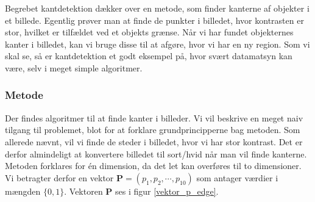 {
Begrebet kantdetektion dækker over en metode, som finder kanterne af
objekter i et billede. Egentlig prøver man at finde de punkter i
billedet, hvor kontrasten er stor, hvilket er tilfældet ved et objekts
grænse. Når vi har fundet objekternes kanter i billedet, kan vi bruge
disse til at afgøre, hvor vi har en ny region.  Som vi skal se, så er
kantdetektion et godt eksempel på, hvor svært datamatsyn kan være, selv
i meget simple algoritmer.

\subsubsection*{Metode}
Der findes algoritmer til at finde kanter i
billeder\cite{SIOlsen}. Vi vil beskrive en meget naiv tilgang til
problemet, blot for at forklare grundprincipperne bag metoden. Som
allerede nævnt, vil vi finde de steder i billedet, hvor vi har stor
kontrast. Det er derfor almindeligt at konvertere billedet til sort/hvid
når man vil finde kanterne. Metoden forklares for én dimension, da det
let kan overføres til to dimensioner. Vi betragter derfor en vektor
$\mathbf{P} = (p_1, p_2, \cdots, p_{10})$ som antager værdier i mængden
$\{0,1\}$. Vektoren $\mathbf{P}$ ses i figur \ref{vektor_p_edge}.

}
